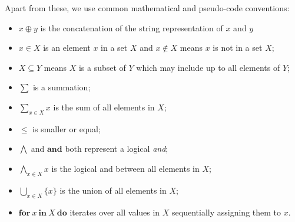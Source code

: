 \documentclass[9pt, oneside]{article}   	%
\begin{document}
Apart from these, we use common mathematical and pseudo-code conventions: 
\begin{itemize}
	\item $x \oplus y$ is the concatenation of the string representation of $x$ and $y$
	\item $x \in X$ is an element $x$ in a set $X$ and $x \notin X$ means $x$ is not in a set $X$;
	\item $X \subseteq Y$ means $X$ is a subset of $Y$ which may include up to all elements of $Y$;
	 \item $\sum$ is a summation;
	 \item $\sum\limits_{x \in X} x$ is the sum of all elements in $X$;
	 \item $\leq$ is smaller or equal;
	 \item $\bigwedge$ and $\textbf{and}$ both represent a logical \textit{and};
	 \item $\bigwedge\limits_{x \in X} x$ is the logical and between all elements in $X$;
	  \item $\bigcup\limits_{x \in X} \{ x \}$ is the union of all elements in $X$;
	 \item $\textbf{for}~x ~\textbf{in}~ X~\textbf{do}$ iterates over all values in $X$ sequentially assigning them to $x$.
\end{itemize}
\end{document}
